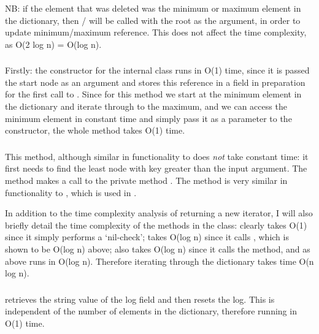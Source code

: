 NB: if the element that was deleted was the minimum or maximum element in the dictionary, then / will be called with the root as the argument, in order to update minimum/maximum reference. This does not affect the time complexity, as O(2 log n) = O(log n).

\subsubsection{}
Firstly: the constructor for the internal class  runs in O(1) time, since it is passed the start node as an argument and stores this reference in a field in preparation for the first call to . Since for this method we start at the minimum element in the dictionary and iterate through to the maximum, and we can access the minimum element in constant time and simply pass it as a parameter to the  constructor, the whole method takes O(1) time.

\subsubsection{}
This method, although similar in functionality to  does \textit{not} take constant time: it first needs to find the least node with key greater than the input argument. The method makes a call to the private method . The method  is very similar in functionality to , which is used in .

In addition to the time complexity analysis of returning a new iterator, I will also briefly detail the time complexity of the methods in the  class: clearly  takes O(1) since it simply performs a `nil-check';  takes O(log n) since it calls , which is shown to be O(log n) above;  also takes O(log n) since it calls the  method, and as above  runs in O(log n). Therefore iterating through the dictionary takes time O(n log n).

\subsubsection{}
 retrieves the string value of the  log field and then resets the log. This is independent of the number of elements in the dictionary, therefore running in O(1) time.

